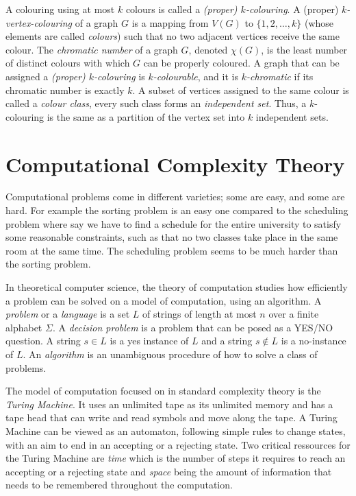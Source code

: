 A colouring using at most $k$ colours is called a \textit{(proper) $k$-colouring}.
A (proper) \textit{$k$-vertex-colouring} of a graph $G$ is a mapping from $V(G)$ to $\{1, 2, \dots, k\}$ (whose elements are called
\textit{colours}) such that no two adjacent vertices receive the same colour.
The \textit{chromatic number} of a graph $G$, denoted $\chi(G)$, is the least number of distinct colours with which $G$ can be properly coloured.
A graph that can be assigned a \textit{(proper) $k$-colouring} is \textit{$k$-colourable}, and it is \textit{$k$-chromatic} if its chromatic number
is exactly $k$. A subset of vertices assigned to the same colour is called a \textit{colour class}, every such class forms an
\textit{independent set}. Thus, a $k$-colouring is the same as a partition of the vertex set into $k$ independent sets.


\section{Computational Complexity Theory} \label{sec:complexity}
Computational problems come in different varieties; some are easy, and some are hard. For example the sorting problem is an easy one compared to the
scheduling problem where say we have to find a schedule for the entire university to satisfy some reasonable constraints, such as that no two classes
take place in the same room at the same time. The scheduling problem seems to be much harder than the sorting problem.

In theoretical computer science, the theory of computation studies how efficiently a problem can be solved on a model of computation, using an
algorithm. A \textit{problem} or a \textit{language} is a set $L$ of strings of length at most $n$ over a finite alphabet $\Sigma$.
A \textit{decision problem} is a problem that can be posed as a YES/NO question. A string $s \in L$ is a yes instance of $L$ and a string $s \notin L$ is
a no-instance of $L$. An \textit{algorithm} is an unambiguous procedure of how to solve a class of problems.

The model of computation focused on in standard complexity theory is the \textit{Turing Machine}. It uses an unlimited tape as its unlimited memory
and has a tape head that can write and read symbols and move along the tape. A Turing Machine can be viewed as an automaton, following simple rules
to change states, with an aim to end in an accepting or a rejecting state. Two critical ressources for the Turing Machine are \textit{time} which is
the number of steps it requires to reach an accepting or a rejecting state and \textit{space} being the amount of information that needs to be
remembered throughout the computation.

